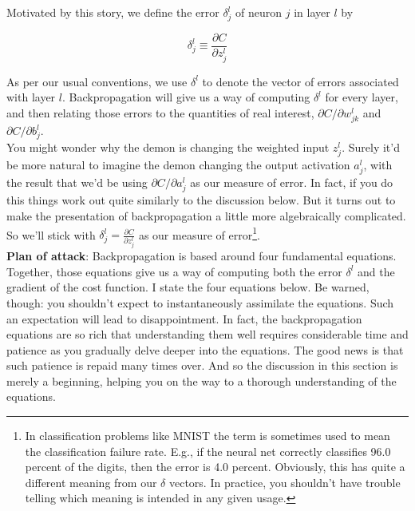 Motivated by this story, we define the error $\delta^l_j$ of neuron $j$ in layer $l$ by

\begin{equation}
\delta^l_j\equiv\frac{\partial C}{\partial z^l_j}
\label{eq: definition of error delta}
\end{equation}

As per our usual conventions, we use $\delta^l$ to denote the vector of errors associated with layer $l$. Backpropagation will give us a way of computing $\delta^l$ for every layer, and then relating those errors to the quantities of real interest, $\partial C/\partial w^l_{jk}$ and $\partial C/\partial b^l_{j}$.\\

You might wonder why the demon is changing the weighted input $z^l_j$. Surely it'd be more natural to imagine the demon changing the output activation $a^l_j$, with the result that we'd be using $\partial C/\partial a^l_{j}$ as our measure of error. In fact, if you do this things work out quite similarly to the discussion below. But it turns out to make the presentation of backpropagation a little more algebraically complicated. So we'll stick with $\delta^l_j=\frac{\partial C}{\partial z^l_j}$ as our measure of error\footnote{In classification problems like MNIST the term  is sometimes used to mean the classification failure rate. E.g., if the neural net correctly classifies 96.0 percent of the digits, then the error is 4.0 percent. Obviously, this has quite a different meaning from our $\delta$ vectors. In practice, you shouldn't have trouble telling which meaning is intended in any given usage.}.\\

\textbf{Plan of attack}: Backpropagation is based around four fundamental equations. Together, those equations give us a way of computing both the error $\delta^l$ and the gradient of the cost function. I state the four equations below. Be warned, though: you shouldn't expect to instantaneously assimilate the equations. Such an expectation will lead to disappointment. In fact, the backpropagation equations are so rich that understanding them well requires considerable time and patience as you gradually delve deeper into the equations. The good news is that such patience is repaid many times over. And so the discussion in this section is merely a beginning, helping you on the way to a thorough understanding of the equations.\\

